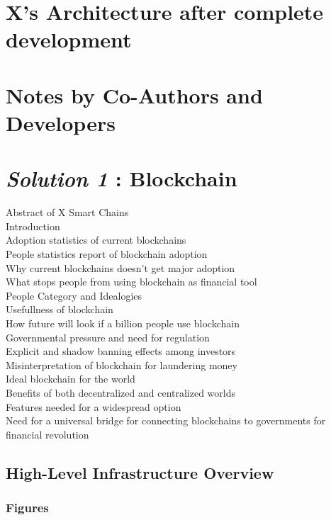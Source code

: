 \documentclass[letterpaper,11pt]{article}
\begin{document}
\section{\textbf{X's Architecture after complete development}}

\section{\textbf{Notes by Co-Authors and Developers}}

\section{\textbf{\textit{Solution 1} : Blockchain}}

Abstract of X Smart Chains\\
Introduction\\
Adoption statistics of current blockchains\\
People statistics report of blockchain adoption\\
Why current blockchains doesn't get major adoption\\
What stops people from using blockchain as financial tool\\
People Category and Idealogies\\
Usefullness of blockchain\\
How future will look if a billion people use blockchain\\
Governmental pressure and need for regulation\\
Explicit and shadow banning effects among investors\\
Misinterpretation of blockchain for laundering money\\
Ideal blockchain for the world\\
Benefits of both decentralized and centralized worlds\\
Features needed for a widespread option\\
Need for a universal bridge for connecting blockchains to governments for financial revolution\\

\subsection{High-Level Infrastructure Overview}


\subsubsection{Figures}
\end{document}
